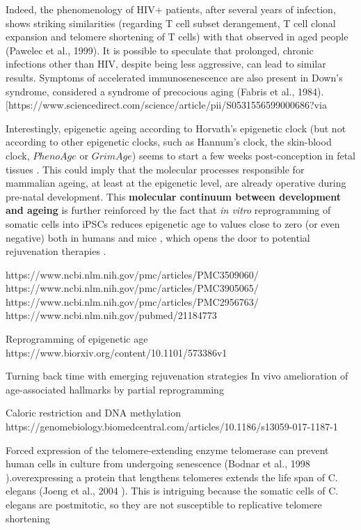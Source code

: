 Indeed, the phenomenology of HIV+ patients, after several years of infection, shows striking similarities (regarding T cell subset derangement, T cell clonal expansion and telomere shortening of T cells) with that observed in aged people (Pawelec et al., 1999). It is possible to speculate that prolonged, chronic infections other than HIV, despite being less aggressive, can lead to similar results. Symptoms of accelerated immunosenescence are also present in Down’s syndrome, considered a syndrome of precocious aging (Fabris et al., 1984). [https://www.sciencedirect.com/science/article/pii/S0531556599000686?via%

Interestingly, epigenetic ageing according to Horvath's epigenetic clock (but not according to other epigenetic clocks, such as Hannum's clock, the skin-blood clock, $PhenoAge$ or $GrimAge$) seems to start a few weeks post-conception in fetal tissues \cite{Hoshino2019}. This could imply that the molecular processes responsible for mammalian ageing, at least at the epigenetic level, are already operative during pre-natal development. This \textbf{molecular continuum between development and ageing} is further reinforced by the fact that \textit{in vitro} reprogramming of somatic cells into \acrshort{iPSCs} reduces epigenetic age to values close to zero (or even negative) both in humans \cite{Horvath2013} and mice \cite{Petkovich2017,Meer2018}, which opens the door to potential rejuvenation therapies \cite{Rando2012,Olova2019}. 

https://www.ncbi.nlm.nih.gov/pmc/articles/PMC3509060/
https://www.ncbi.nlm.nih.gov/pmc/articles/PMC3905065/
https://www.ncbi.nlm.nih.gov/pmc/articles/PMC2956763/
https://www.ncbi.nlm.nih.gov/pubmed/21184773

Reprogramming of epigenetic age
https://www.biorxiv.org/content/10.1101/573386v1


Turning back time with emerging rejuvenation strategies
In vivo amelioration of age-associated hallmarks by partial reprogramming

Caloric restriction and DNA methylation https://genomebiology.biomedcentral.com/articles/10.1186/s13059-017-1187-1


Forced expression of the telomere-extending enzyme telomerase can prevent human cells in culture from undergoing senescence (Bodnar et al., 1998
).overexpressing a protein that lengthens telomeres extends the life span of C. elegans (Joeng et al., 2004
). This is intriguing because the somatic cells of C. elegans are postmitotic, so they are not susceptible to replicative telomere shortening

